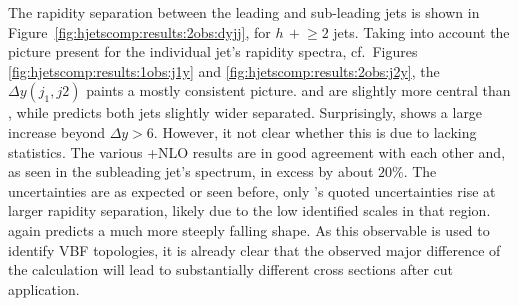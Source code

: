 The rapidity separation between the leading and sub-leading jets is
shown in Figure~\ref{fig:hjetscomp:results:2obs:dyjj}, for $h\,+\!\ge\!\!2$
jets. Taking into account the picture present for the individual 
jet's rapidity spectra, cf.\ Figures \ref{fig:hjetscomp:results:1obs:j1y} and 
\ref{fig:hjetscomp:results:2obs:j2y}, the $\Delta y(j_1,j2)$ paints a mostly 
consistent picture. \Sherpa \NNLOPS and \MGaMC are slightly more central 
than \Powheg \NNLOPS, while \Sherpa \MEPSatNLO predicts both jets 
slightly wider separated. Surprisingly, \Herwig shows a large increase 
beyond $\Delta y>6$. However, it not clear whether this is due to 
lacking statistics. The various \GoSam{}+\Sherpa NLO results are in good 
agreement with each other and, as seen in the subleading jet's spectrum, 
in excess by about $20\%$. The uncertainties are as expected or seen 
before, only \Sherpa \MEPSatNLO's quoted uncertainties rise at 
larger rapidity separation, likely due to the low identified scales in 
that region. \Hej again predicts a much more steeply falling shape. 
As this observable is used to identify VBF topologies, it is already 
clear that the observed major difference of the \Hej calculation will 
lead to substantially different cross sections after cut application.

